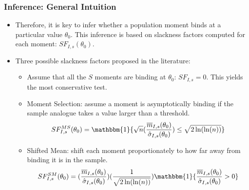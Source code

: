 \begin{frame}
\frametitle{Inference: General Intuition}

\begin{itemize}
	\item Therefore, it is key to infer whether a population moment binds at a particular value $\theta_{0}$. This inference is based on slackness factors computed for each moment: $SF_{I,s}(\theta_{0})$. 
	\item Three possible slackness factors proposed in the literature:
	\begin{itemize}
		\item Assume that all the $S$ moments are binding at $\theta_{0}$: $SF_{I,s}=0$. This yields the most conservative test.
		\item Moment Selection: assume a moment is asymptotically binding if the sample analogue takes a value larger than a threshold.
		\begin{equation*}
		SF^{MS}_{I,s}(\theta_{0})=\mathbbm{1}\{\sqrt{n}(\frac{\overline{m}_{I,s}(\theta_{0})}{\hat{\sigma }_{I,s}(\theta_{0})})\leq\sqrt{2\ln (\ln (n))}\}
		\end{equation*}
		\item Shifted Mean: shift each moment proportionately to how far away from binding it is in the sample.
		\begin{equation*}
		SF^{SM}_{I,s}(\theta_{0})=(\frac{\overline{m}_{I,s}(\theta_{0})}{\hat{\sigma}_{I,s}(\theta_{0})})(\frac{1}{\sqrt{2\ln(\ln (n))}})\mathbbm{1}\{\frac{\overline{m}_{I,s}(\theta_{0})}{\hat{\sigma}_{I,s}(\theta_{0})}>0\}
		\end{equation*}
	\end{itemize}
\end{itemize}
\end{frame}
